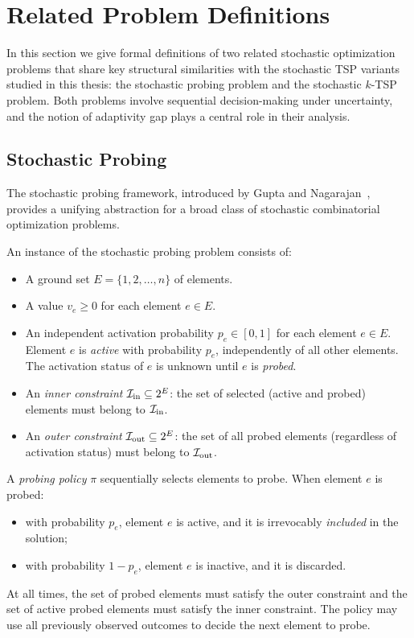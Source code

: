 \section{Related Problem Definitions}\label{sec:relateddef}

In this section we give formal definitions of two related stochastic optimization problems that share key structural similarities with the stochastic TSP variants studied in this thesis: the stochastic probing problem and the stochastic $k$-TSP problem. Both problems involve sequential decision-making under uncertainty, and the notion of adaptivity gap plays a central role in their analysis.

\subsection{Stochastic Probing}

The stochastic probing framework, introduced by Gupta and Nagarajan~\cite{GuptaNagarajan2013}, provides a unifying abstraction for a broad class of stochastic combinatorial optimization problems.

\begin{definition}
    An instance of the stochastic probing problem consists of:
    \begin{itemize}
        \item A ground set $E = \{1, 2, \dots, n\}$ of elements.
        \item A value $v_e \ge 0$ for each element $e \in E$.
        \item An independent activation probability $p_e \in [0,1]$ for each element $e \in E$. Element $e$ is \emph{active} with probability $p_e$, independently of all other elements. The activation status of $e$ is unknown until $e$ is \emph{probed}.
        \item An \emph{inner constraint} $\mathcal{I}_{\mathrm{in}} \subseteq 2^E$: the set of selected (active and probed) elements must belong to $\mathcal{I}_{\mathrm{in}}$.
        \item An \emph{outer constraint} $\mathcal{I}_{\mathrm{out}} \subseteq 2^E$: the set of all probed elements (regardless of activation status) must belong to $\mathcal{I}_{\mathrm{out}}$.
    \end{itemize}
\end{definition}

A \emph{probing policy} $\pi$ sequentially selects elements to probe. When element $e$ is probed:
\begin{itemize}
    \item with probability $p_e$, element $e$ is active, and it is irrevocably \emph{included} in the solution;
    \item with probability $1 - p_e$, element $e$ is inactive, and it is discarded.
\end{itemize}
At all times, the set of probed elements must satisfy the outer constraint and the set of active probed elements must satisfy the inner constraint. The policy may use all previously observed outcomes to decide the next element to probe.


